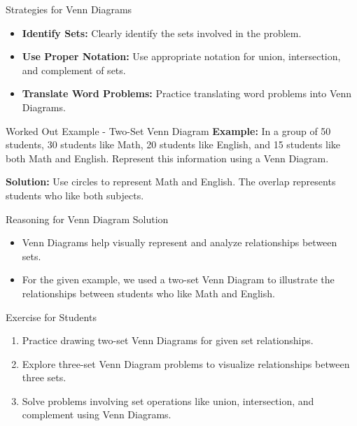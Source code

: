 \begin{frame}{Strategies for Venn Diagrams}
  \begin{itemize}
    \item \textbf{Identify Sets:} Clearly identify the sets involved in the problem.
    \item \textbf{Use Proper Notation:} Use appropriate notation for union, intersection, and complement of sets.
    \item \textbf{Translate Word Problems:} Practice translating word problems into Venn Diagrams.
  \end{itemize}
\end{frame}

\begin{frame}{Worked Out Example - Two-Set Venn Diagram}
  \textbf{Example:} In a group of 50 students, 30 students like Math, 20 students like English, and 15 students like both Math and English. Represent this information using a Venn Diagram.

  \textbf{Solution:} Use circles to represent Math and English. The overlap represents students who like both subjects.
\end{frame}

\begin{frame}{Reasoning for Venn Diagram Solution}
  \begin{itemize}
    \item Venn Diagrams help visually represent and analyze relationships between sets.
    \item For the given example, we used a two-set Venn Diagram to illustrate the relationships between students who like Math and English.
  \end{itemize}
\end{frame}

\begin{frame}{Exercise for Students}
  \begin{enumerate}
    \item Practice drawing two-set Venn Diagrams for given set relationships.
    \item Explore three-set Venn Diagram problems to visualize relationships between three sets.
    \item Solve problems involving set operations like union, intersection, and complement using Venn Diagrams.
  \end{enumerate}
\end{frame}
